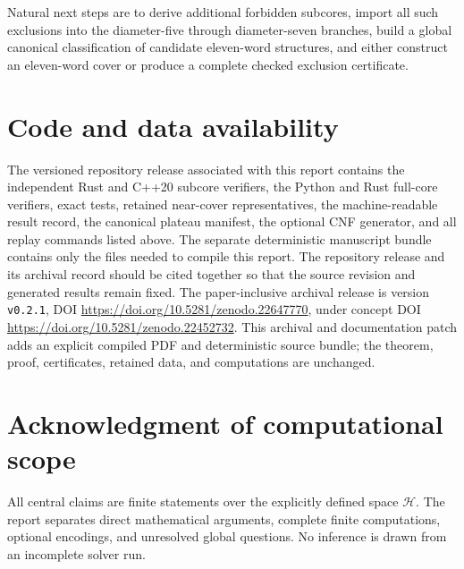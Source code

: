 \documentclass[11pt]{article}
\newcommand{\Hspace}{\mathcal{H}}
\begin{document}
Natural next steps are to derive additional forbidden subcores, import all
such exclusions into the diameter-five through diameter-seven branches,
build a global canonical classification of candidate eleven-word
structures, and either construct an eleven-word cover or produce a complete
checked exclusion certificate.

\section{Code and data availability}

The versioned repository release associated with this report contains the
independent Rust and C++20 subcore verifiers, the Python and Rust full-core
verifiers, exact tests, retained near-cover representatives, the
machine-readable result record, the canonical plateau manifest, the optional
CNF generator, and all replay commands listed above.  The separate
deterministic manuscript bundle contains only the files needed to compile
this report.  The repository release and its archival record should be cited
together so that the source revision and generated results remain fixed.
The paper-inclusive archival release is version \texttt{v0.2.1}, DOI
\url{https://doi.org/10.5281/zenodo.22647770}, under concept DOI
\url{https://doi.org/10.5281/zenodo.22452732}.  This archival and
documentation patch adds an explicit compiled PDF and deterministic source
bundle; the theorem, proof, certificates, retained data, and computations
are unchanged.

\section*{Acknowledgment of computational scope}

All central claims are finite statements over the explicitly defined
space \(\Hspace\).  The report separates direct mathematical arguments,
complete finite computations, optional encodings, and unresolved global
questions.  No inference is drawn from an incomplete solver run.
\end{document}
